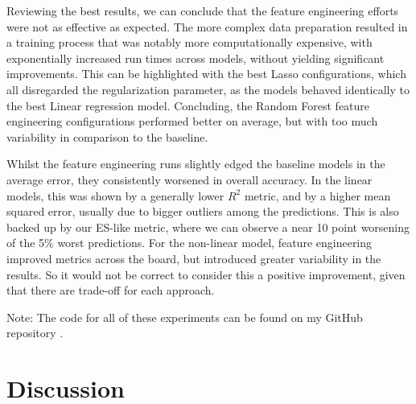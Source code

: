 \documentclass[12pt]{report} %
\begin{document}
Reviewing the best results, we can conclude that the feature engineering efforts were not as effective as expected. The more complex data preparation resulted in a training process that was notably more computationally expensive, with exponentially increased run times across models, without yielding significant improvements. This can be highlighted with the best Lasso configurations, which all disregarded the regularization parameter, as the models behaved identically to the best Linear regression model. Concluding, the Random Forest feature engineering configurations performed better on average, but with too much variability in comparison to the baseline.

Whilst the feature engineering runs slightly edged the baseline models in the average error, they consistently worsened in overall accuracy. In the linear models, this was shown by a generally lower $R^2$ metric, and by a higher mean squared error, usually due to bigger outliers among the predictions. This is also backed up by our ES-like metric, where we can observe a near 10 point worsening of the 5\% worst predictions. For the non-linear model, feature engineering improved metrics across the board, but introduced greater variability in the results. So it would not be correct to consider this a positive improvement, given that there are trade-off for each approach.

Note: The code for all of these experiments can be found on my GitHub repository \cite{rodrigodelamaTFG}.


\section{Discussion} %



\end{document}
